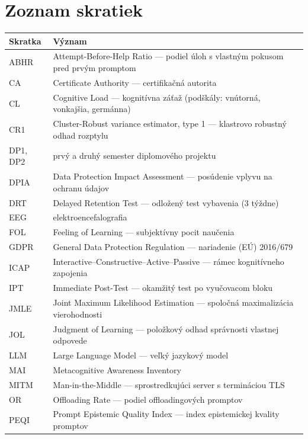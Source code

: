 \chapter*{Zoznam skratiek}

\bgroup
\def\arraystretch{1.25}
\noindent
\begin{tabular}{@{}p{2.1cm}p{10.9cm}@{}}
\textbf{Skratka} & \textbf{Význam} \\
\hline
    ABHR    & Attempt-Before-Help Ratio --- podiel úloh s vlastným pokusom pred prvým promptom \\
    CA      & Certificate Authority --- certifikačná autorita \\
    CL      & Cognitive Load --- kognitívna záťaž (podškály: vnútorná, vonkajšia, germánna) \\
    CR1     & Cluster-Robust variance estimator, type 1 --- klastrovo robustný odhad rozptylu \\
    DP1, DP2& prvý a druhý semester diplomového projektu \\
    DPIA    & Data Protection Impact Assessment --- posúdenie vplyvu na ochranu údajov \\
    DRT     & Delayed Retention Test --- odložený test vybavenia (3 týždne) \\
    EEG     & elektroencefalografia \\
    FOL     & Feeling of Learning --- subjektívny pocit naučenia \\
    GDPR    & General Data Protection Regulation --- nariadenie (EÚ) 2016/679 \\
    ICAP    & Interactive--Constructive--Active--Passive --- rámec kognitívneho zapojenia \\
    IPT     & Immediate Post-Test --- okamžitý test po vyučovacom bloku \\
    JMLE    & Joint Maximum Likelihood Estimation --- spoločná maximalizácia vierohodnosti \\
    JOL     & Judgment of Learning --- položkový odhad správnosti vlastnej odpovede \\
    LLM     & Large Language Model --- veľký jazykový model \\
    MAI     & Metacognitive Awareness Inventory \\
    MITM    & Man-in-the-Middle --- sprostredkujúci server s termináciou TLS \\
    OR      & Offloading Rate --- podiel offloadingových promptov \\
    PEQI    & Prompt Epistemic Quality Index --- index epistemickej kvality promptov \\

\end{tabular}
